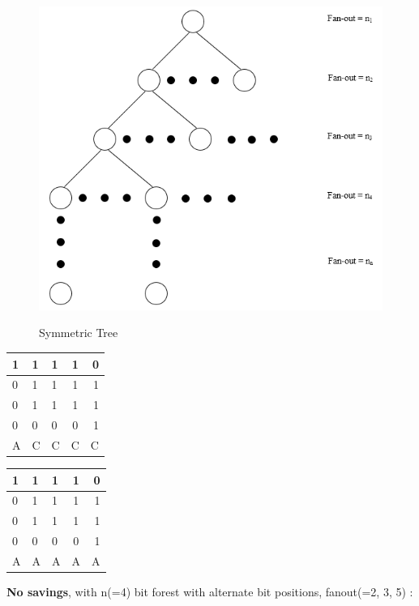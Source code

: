 	\begin{figure}[hp]
		\centering
		\includegraphics[scale=0.5]{images/symmetric-tree.png}\\
		\caption{Symmetric Tree}
	\end{figure}

	\begin{multicols}{2}

		\begin{tabular}{ l | l l c r }
		  1 & 1 & 1 & 1 & 0 \\
		  \hline
		  0 & 1 & 1 & 1 & 1 \\
		  0 & 1 & 1 & 1 & 1 \\
		  0 & 0 & 0 & 0 & 1 \\
		  \hline	
		  A & C & C & C & C\\
		\end{tabular}
	\columnbreak{|}
		\begin{tabular}{ l | l l c r }
		  1 & 1 & 1 & 1 & 0 \\
		  \hline
		  0 & 1 & 1 & 1 & 1 \\
		  0 & 1 & 1 & 1 & 1 \\
		  0 & 0 & 0 & 0 & 1 \\
		  \hline	
		  A & A & A & A & A\\
		\end{tabular}
	\end{multicols}

	\textbf{No savings}, with n(=4) bit forest with alternate bit positions, fanout(=2, 3, 5) :

